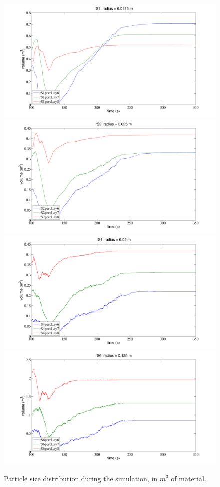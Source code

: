 \begin{figure}[htbp]
\centering 
  \subfloat%
  {
	  \includegraphics[width=.70\columnwidth]{113rS120151111150702}
	  \label{fig:113rS120151111150702}
  }
  \\
    \subfloat
    {
	  \includegraphics[width=.70\columnwidth]{115rS220151111150702}
	  \label{fig:115rS220151111150702}
  }
  \\
  \subfloat%
  {
	  \includegraphics[width=.70\columnwidth]{117rS420151111150702}
	  \label{fig:117rS420151111150702}
  }
  \\
    \subfloat%
    {
	  \includegraphics[width=.70\columnwidth]{119rS620151111150702}
	  \label{fig:119rS620151111150702}  }
  \\
  \caption{Particle size distribution during the simulation, in $m^3$ of
  material.}
  \label{fig:096sinterplots}
\end{figure}